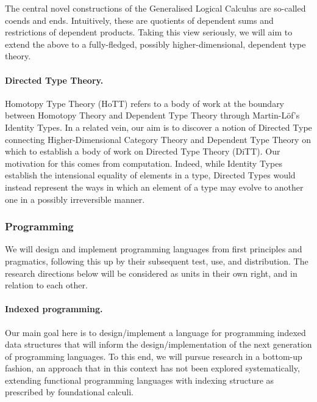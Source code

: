 \documentclass[11pt,twocolumn]{article}
\newcommand{\hl}[1]{#1}%
\begin{document}
The central novel constructions of the Generalised Logical Calculus are
so-called coends and ends.  Intuitively, these are quotients of dependent sums
and restrictions of dependent products.  Taking this view seriously, we will
\hl{aim} to extend the above to a fully-fledged, possibly
higher-dimensional, dependent type theory.  

\paragraph{Directed Type Theory.}
\label{DirectedTypeTheoryParagraph}

Homotopy Type Theory (HoTT) refers to a body of work at the boundary between
Homotopy Theory and Dependent Type Theory through Martin-L\"of's Identity
Types. %
In a related vein, our \hl{aim} is to discover a notion of Directed Type
connecting Higher-Dimensional Category Theory and Dependent Type Theory on
which to establish a body of work on Directed Type Theory (DiTT).  Our
\hl{motivation} for this comes from computation.  Indeed, while Identity
Types establish the intensional equality of elements in a type, Directed Types
would instead represent the ways in which an element of a type may evolve to
another one in a possibly irreversible manner.  

\subsubsection{Programming}
\label{Programming}

We will design and implement programming languages from first principles and
pragmatics, following this up by their subsequent test, use, and distribution.
The research directions below will be considered as units in their own right,
and in relation to each other.

\paragraph{Indexed programming.}
\label{IndexedProgrammingParagraph}

Our main \hl{goal} here is to design/implement a language for programming
indexed data structures that will inform the design/implementation of the next
generation of programming languages.  To this end, we will pursue
\hl{research} in a bottom-up fashion, an approach that in this context has not
been explored systematically, extending functional programming languages with
indexing structure as prescribed by foundational calculi.
\end{document}

